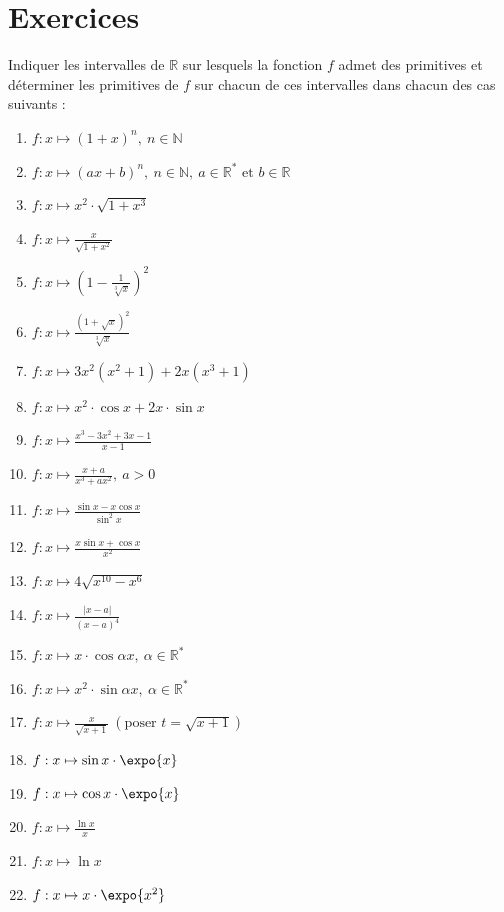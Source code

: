 \section{Exercices}
\begin{exo}
      Indiquer les intervalles de $\mathbb{R}$ sur lesquels la fonction $f$ admet des primitives et
      d\'eterminer les primitives de $f$ sur chacun de ces intervalles dans chacun des cas suivants : 
            \begin{enumerate}
                  \item $f : x \mapsto (1+x)^n,\ n \in \mathbb{N}$
                  \item $f : x \mapsto (ax+b)^n,\ n \in \mathbb{N},\ a\in\mathbb{R}^* \text{ et } b\in \mathbb{R}$
                  \item $f : x \mapsto x^2 \cdot \sqrt{1+x^3}$
                  \item $f : x \mapsto \frac{x}{\sqrt{1+x^2}}$
                  \item $f : x \mapsto \left( 1 - \frac{1}{\sqrt[3]{x}} \right)^2$
                  \item $f : x \mapsto \frac{\left(1+\sqrt{x}\right)^2}{\sqrt[3]{x}}$
                  \item $f : x \mapsto 3x^2 (x^2+1) + 2x (x^3 + 1)$
                  \item $f : x \mapsto x^2 \cdot \cos x + 2x \cdot \sin x$
                  \item $f : x \mapsto \frac{x^3 - 3x^2 + 3x -1}{x-1}$
                  \item $f : x \mapsto \frac{x+a}{x^3 + a x^2} ,\ a>0$
                  \item $f : x \mapsto \frac{\sin x - x \cos x}{\sin^2 x}$
                  \item $f : x \mapsto \frac{x \sin x + \cos x}{x^2}$
                  \item $f : x \mapsto 4\sqrt{x^{10} - x^6}$
                  \item $f : x \mapsto \frac{|x-a|}{(x-a)^4}$
                  \item $f : x \mapsto x\cdot \cos \alpha x ,\ \alpha \in \mathbb{R}^*$
                  \item $f : x \mapsto x^2 \cdot \sin \alpha x,\ \alpha \in \mathbb{R}^*$
                  \item $f : x \mapsto \frac{x}{\sqrt{x+1}} \ (\text{poser $t=\sqrt{x+1}$})$
                  \item $f : x \mapsto \sin x \cdot \expo{x}$
                  \item $f : x \mapsto \cos x \cdot \expo{x}$
                  \item $f : x \mapsto \frac{\ln x}{x}$
                  \item $f : x \mapsto \ln x$
                  \item $f : x \mapsto x \cdot \expo{x^2}$
            \end{enumerate}
\end{exo}

